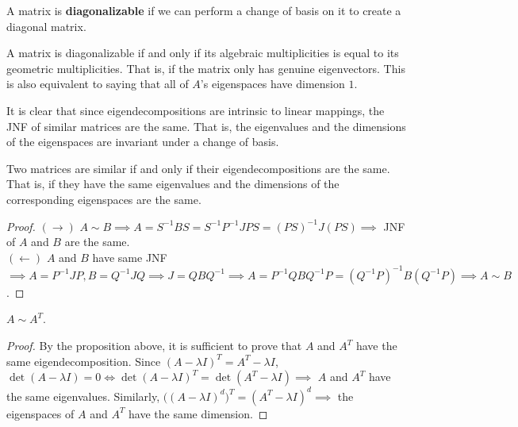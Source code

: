   \begin{definition}
  A matrix is \textbf{diagonalizable} if we can perform a change of basis on it to create a diagonal matrix. 
  \end{definition}

  \begin{theorem}
  A matrix is diagonalizable if and only if its algebraic multiplicities is equal to its geometric multiplicities. That is, if the matrix only has genuine eigenvectors. This is also equivalent to saying that all of $A$'s eigenspaces have dimension $1$. 
  \end{theorem}

  It is clear that since eigendecompositions are intrinsic to linear mappings, the JNF of similar matrices are the same. That is, the eigenvalues and the dimensions of the eigenspaces are invariant under a change of basis. 

  \begin{proposition}
  Two matrices are similar if and only if their eigendecompositions are the same. That is, if they have the same eigenvalues and the dimensions of the corresponding eigenspaces are the same. 
  \end{proposition}

  \begin{proof}
  $(\rightarrow)$ $A \sim B \implies A = S^{-1} B S = S^{-1} P^{-1} J P S = (PS)^{-1} J (PS) \implies$ JNF of $A$ and $B$ are the same.  \\
  $(\leftarrow)$ $A$ and $B$ have same JNF $\implies A = P^{-1} J P, B = Q^{-1} J Q \implies J = Q B Q^{-1} \implies A = P^{-1} Q B Q^{-1} P = (Q^{-1} P)^{-1} B (Q^{-1} P) \implies A \sim B$. 
  \end{proof}

  \begin{theorem}
  $A \sim A^T$. 
  \end{theorem}
  \begin{proof}
  By the proposition above, it is sufficient to prove that $A$ and $A^T$ have the same eigendecomposition. Since $(A - \lambda I)^T = A^T - \lambda I$, $\det{(A - \lambda I)} = 0 \iff \det{(A - \lambda I)^T} = \det{(A^T - \lambda I)} \implies $ $A$ and $A^T$ have the same eigenvalues. Similarly, $\big( (A - \lambda I)^d \big)^T = (A^T - \lambda I)^d \implies$ the eigenspaces of $A$ and $A^T$ have the same dimension. 
  \end{proof}

